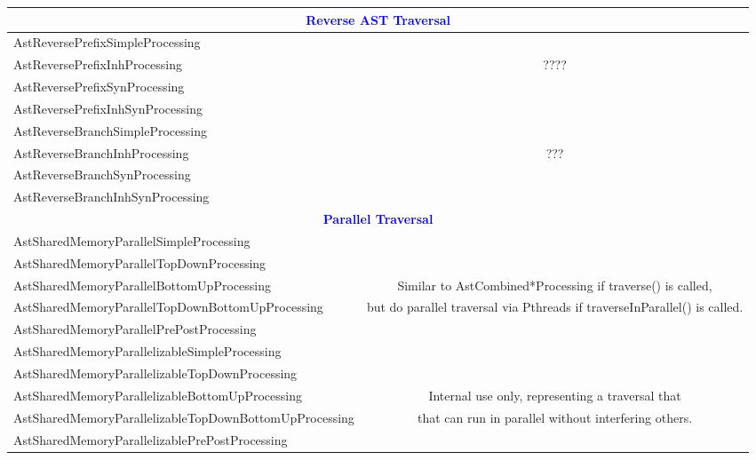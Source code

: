 \begin{table}[htbp]
{\begin{tabular}{||l|c|p{1.0in}|c|p{0.8in}|c|p{1.0in}||}
 \multicolumn{7}{||c||}{\textbf{\textcolor{blue}{Reverse AST Traversal}}} \\\hline \hline
AstReversePrefixSimpleProcessing &  \multicolumn{6}{|c||}{} \\ \cline{1-1}
AstReversePrefixInhProcessing &  \multicolumn{6}{|c||}{ ???? } \\ \cline{1-1}
AstReversePrefixSynProcessing &  \multicolumn{6}{|c||}{} \\ \cline{1-1}
AstReversePrefixInhSynProcessing &  \multicolumn{6}{|c||}{} \\ \hline \hline

AstReverseBranchSimpleProcessing &  \multicolumn{6}{|c||}{} \\ \cline{1-1}
AstReverseBranchInhProcessing &  \multicolumn{6}{|c||}{ ??? } \\ \cline{1-1}
AstReverseBranchSynProcessing &  \multicolumn{6}{|c||}{} \\ \cline{1-1}
AstReverseBranchInhSynProcessing &  \multicolumn{6}{|c||}{} \\ \hline \hline

 \multicolumn{7}{||c||}{\textbf{\textcolor{blue}{Parallel Traversal}}} \\\hline \hline
AstSharedMemoryParallelSimpleProcessing &  \multicolumn{6}{|c||}{} \\
\cline{1-1}
AstSharedMemoryParallelTopDownProcessing &  \multicolumn{6}{|c||}{} \\
\cline{1-1}
AstSharedMemoryParallelBottomUpProcessing &  \multicolumn{6}{|c||}{ Similar
to AstCombined*Processing if traverse() is called,} \\
\cline{1-1}
AstSharedMemoryParallelTopDownBottomUpProcessing &  \multicolumn{6}{|c||}{
but do parallel traversal via Pthreads if traverseInParallel() is called.}
\\ \cline{1-1}
AstSharedMemoryParallelPrePostProcessing &  \multicolumn{6}{|c||}{} \\
\hline \hline

AstSharedMemoryParallelizableSimpleProcessing &   \multicolumn{6}{|c||}{}
\\ \cline{1-1}
AstSharedMemoryParallelizableTopDownProcessing &  \multicolumn{6}{|c||}{}
\\ \cline{1-1} 
AstSharedMemoryParallelizableBottomUpProcessing &
\multicolumn{6}{|c||}{Internal use only, representing a traversal that}
\\ \cline{1-1}
AstSharedMemoryParallelizableTopDownBottomUpProcessing &
\multicolumn{6}{|c||}{ that can run in parallel without interfering others.} \\ \cline{1-1}
AstSharedMemoryParallelizablePrePostProcessing &  \multicolumn{6}{|c||}{}
\\ \hline \hline



\end{tabular}}
\end{table}
